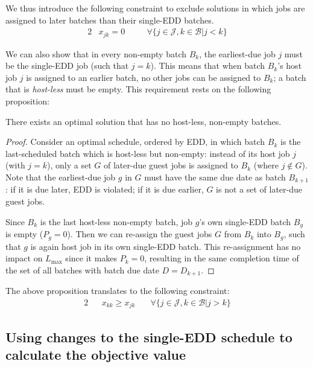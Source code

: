 \documentclass[oribibl]{llncs}
\def\Lmax{{L_{\mathrm{max}}}}
\begin{document}
We thus introduce the following constraint to exclude solutions
in which jobs are assigned to later batches than their single-EDD
batches.
\begin{alignat}{2}
  & x_{jk} = 0 \quad && \forall \{j \in \mathcal{J}, k \in \mathcal{B} | j < k\} \label{eq:mipnopp}
\end{alignat}

We can also show that in every non-empty batch $B_k$,
the earliest-due job $j$ must be the single-EDD job (such that $j =
k$). This means that when batch $B_k$'s host job $j$ is assigned to an
earlier batch, no other jobs can be assigned to $B_k$; a batch
that is \textit{host-less} must be empty. This requirement rests on the
following proposition:

\begin{proposition}\label{prop:nohostless}
There exists an optimal solution that has no host-less, non-empty batches.
\end{proposition}
\begin{proof}
Consider an optimal schedule, ordered by EDD, in which batch $B_k$ is the
last-scheduled batch which is host-less but non-empty: instead of its host job
$j$ (with $j=k$), only a set $G$ of later-due guest jobs is assigned
to $B_k$ (where $j \notin G$). Note that the earliest-due job $g$ in $G$ must have the same
due date as batch $B_{k+1}$: if it is due later, EDD is violated; if it
is due earlier, $G$ is not a set of later-due guest jobs. 

Since $B_k$ is the last host-less non-empty batch, job $g$'s own single-EDD
batch $B_g$ is empty ($P_g = 0$). Then we can re-assign the guest jobs
$G$ from $B_k$ into $B_g$, such that $g$ is again host job in its own
single-EDD batch. This re-assignment has no impact on $\Lmax$ since it
makes $P_k = 0$, resulting in the same completion time of the set of all
batches with batch due date $D = D_{k+1}$.
\end{proof}

The above proposition translates to the following constraint:
\begin{alignat}{2}
  && x_{kk} \geq x_{jk} \quad & \forall\{j \in \mathcal{J}, k \in \mathcal{B} |
j> k\}
\end{alignat}

\subsection{Using changes to the single-EDD schedule to calculate the objective value}
\label{sec:moves}
\end{document}
